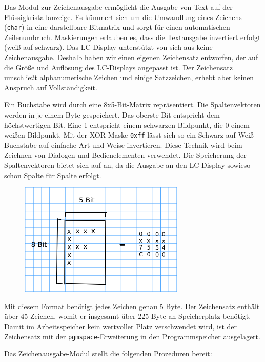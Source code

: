 \documentclass[ngerman]{article}
\begin{document}
Das Modul zur Zeichenausgabe ermöglicht die Ausgabe von Text auf
der Flüs\-sig\-kris\-tall\-an\-zei\-ge. Es kümmert sich um die Umwandlung
eines Zeichens ({\tt char}) in eine darstellbare Bitmatrix und sorgt für
einen automatischen Zeilenumbruch. Maskierungen erlauben es, dass die
Textausgabe invertiert erfolgt (weiß auf schwarz). Das LC-Display 
unterstützt von sich aus keine Zeichenausgabe. Deshalb haben wir einen
eigenen Zeichensatz entworfen, der auf die Größe und Auflösung des 
LC-Displays angepasst ist. Der Zeichensatz umschließt alphanumerische
Zeichen und einige Satzzeichen, erhebt aber keinen Anspruch auf
Vollständigkeit.

Ein Buchstabe wird durch eine 8x5-Bit-Matrix repräsentiert. Die
Spaltenvektoren werden in je einem Byte gespeichert. Das oberste Bit
entspricht dem höchstwertigen Bit. Eine 1 entspricht einem schwarzen
Bildpunkt, die 0 einem weißen Bildpunkt. Mit der XOR-Maske {\tt 0xff} lässt
sich so ein Schwarz-auf-Weiß-Buchstabe auf einfache Art und Weise
invertieren. Diese Technik wird beim Zeichnen von Dialogen und Bedienelementen 
verwendet. Die Speicherung der Spaltenvektoren bietet sich auf an,
da die Ausgabe an den LC-Display sowieso schon Spalte für Spalte erfolgt.

\begin{figure}[h!] \begin{center}
    \includegraphics[width=0.7\textwidth]{media/char}
\end{center} \end{figure}

Mit diesem Format benötigt jedes Zeichen genau 5 Byte. Der Zeichensatz
enthält über 45 Zeichen, womit er insgesamt über 225 Byte an
Speicherplatz benötigt. Damit im Arbeitsspeicher kein wertvoller Platz  
verschwendet wird, ist der Zeichensatz mit der
{\tt pgmspace}-Erweiterung in den Programmspeicher ausgelagert.

Das Zeichenausgabe-Modul stellt die folgenden Prozeduren bereit:

\end{document}
